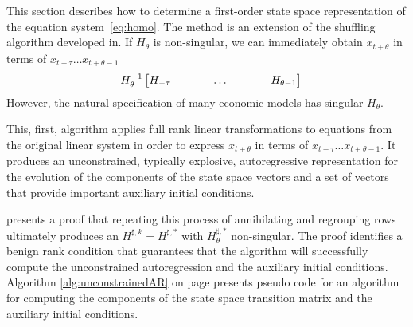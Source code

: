 \documentclass[12pt]{elsart}
\begin{document}
This section describes how to determine a first-order state space
representation of the equation system~\ref{eq:homo}. The method is an extension
of the shuffling algorithm developed in\cite{luenberger78,luenberger77}.
If $H_\theta$ is non-singular, we can immediately obtain $x_{t+\theta}$ 
in terms of $x_{t-\tau} \ldots x_{t+\theta-1}$
\begin{gather}
-  H_{\theta}^{-1}\begin{bmatrix}
    H_{-\tau}&\hspace{0.25in}&\dots&\hspace{0.25in}&H_{\theta-1}
  \end{bmatrix}  
\end{gather}
However, the natural specification of many economic models has singular
 $H_\theta$.

This, first,  algorithm
applies full rank linear transformations 
to equations from the original linear system in order to express
$x_{t+\theta}$ in terms of $x_{t-\tau} \ldots x_{t+\theta-1}$.
It produces an unconstrained, typically explosive, 
autoregressive representation for the evolution of the components of
the state space vectors and a set of vectors 
that provide important auxiliary initial conditions. 






\label{sec:gfrr}

% 
% 
% 

\cite{anderson10} presents a proof that repeating 
this process of annihilating and regrouping rows ultimately  produces 
an $H^{\sharp,k}=H^{\sharp,\ast}$ with $H^{\sharp,\ast}_\theta$ non-singular.
The proof identifies a benign rank condition 
that guarantees that the algorithm will successfully compute
the unconstrained autoregression and the auxiliary initial conditions.
Algorithm \ref{alg:unconstrainedAR} on page \pageref{alg:unconstrainedAR} presents pseudo code for 
an algorithm for computing the 
components of the state space transition matrix and the auxiliary initial
conditions.
\end{document}
